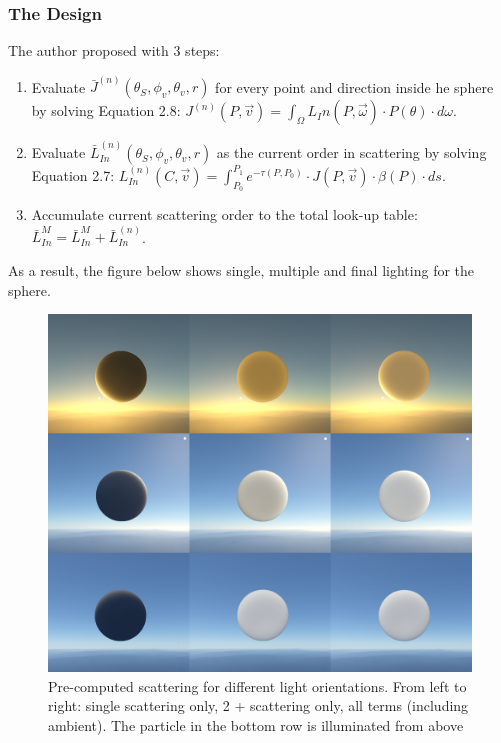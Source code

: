 \subsubsection{The Design}
The author proposed with 3 steps:
\begin{enumerate}
\item Evaluate $\bar{J}^{(n)}(\theta_S, \phi_v, \theta_v, r)$  for every point and direction inside he sphere by solving Equation 2.8: $J^{(n)}(P, \vec{v}) = \int_{\Omega}L_In(P, \vec{\omega}) \cdot P(\theta) \cdot d\omega$.
\item Evaluate $\bar{L}_{In}^{(n)}(\theta_S, \phi_v, \theta_v, r)$ as the current order in scattering by solving Equation 2.7: $L_{In}^{(n)}(C, \vec{v}) = \int_{P_0}^{P_1}e^{-\tau(P, P_0)} \cdot J(P, \vec{v}) \cdot \beta(P) \cdot ds$.
\item Accumulate current scattering order to the total look-up table: $\bar{L}_{In}^M = \bar{L}_{In}^M + \bar{L}_{In}^{(n)}$.
\end{enumerate}
As a result, the figure below shows single, multiple and final lighting for the sphere.
\begin{figure}[htp]
\begin{center}
\includegraphics[scale=0.1]{images/scatteringresult.png}
\caption{Pre-computed scattering for different light orientations.
From left to right: single scattering only, 2 + scattering
only, all terms (including ambient). The particle in the bottom
row is illuminated from above}
\label{f12}
\end{center}
\end{figure}
